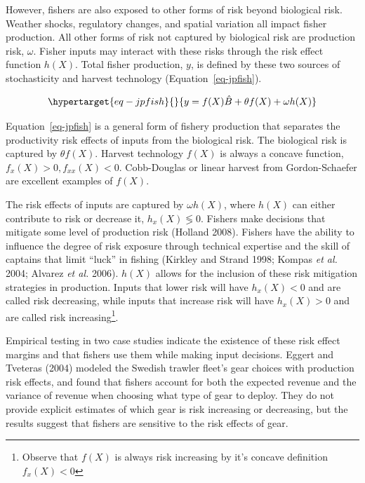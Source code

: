 \documentclass[
  letterpaper,
  DIV=11,
  numbers=noendperiod]{scrartcl}
\theoremstyle{plain}
\theoremstyle{plain}
\theoremstyle{remark}
\begin{document}
However, fishers are also exposed to other forms of risk beyond
biological risk. Weather shocks, regulatory changes, and spatial
variation all impact fisher production. All other forms of risk not
captured by biological risk are production risk, \(\omega\). Fisher
inputs may interact with these risks through the risk effect function
\(h(X)\). Total fisher production, \(y\), is defined by these two
sources of stochasticity and harvest technology
(Equation~\ref{eq-jpfish}).

\begin{equation}\protect\hypertarget{eq-jpfish}{}{
y=f(X)\hat{B}+\theta f(X)+\omega h(X)
}\label{eq-jpfish}\end{equation}

Equation~\ref{eq-jpfish} is a general form of fishery production that
separates the productivity risk effects of inputs from the biological
risk. The biological risk is captured by \(\theta f(X)\). Harvest
technology \(f(X)\) is always a concave function,
\(f_x(X)>0,f_{xx}(X)<0\). Cobb-Douglas or linear harvest from
Gordon-Schaefer are excellent examples of \(f(X)\).

The risk effects of inputs are captured by \(\omega h(X)\), where
\(h(X)\) can either contribute to risk or decrease it,
\(h_x(X)\lessgtr0\). Fishers make decisions that mitigate some level of
production risk (Holland 2008). Fishers have the ability to influence
the degree of risk exposure through technical expertise and the skill of
captains that limit ``luck'' in fishing (Kirkley and Strand 1998; Kompas
\emph{et al.} 2004; Alvarez \emph{et al.} 2006). \(h(X)\) allows for the
inclusion of these risk mitigation strategies in production. Inputs that
lower risk will have \(h_x(X)<0\) and are called risk decreasing, while
inputs that increase risk will have \(h_x(X)>0\) and are called risk
increasing\footnote{Observe that \(f(X)\) is always risk increasing by
  it's concave definition \(f_x(X)<0\)}.

Empirical testing in two case studies indicate the existence of these
risk effect margins and that fishers use them while making input
decisions. Eggert and Tveteras (2004) modeled the Swedish trawler
fleet's gear choices with production risk effects, and found that
fishers account for both the expected revenue and the variance of
revenue when choosing what type of gear to deploy. They do not provide
explicit estimates of which gear is risk increasing or decreasing, but
the results suggest that fishers are sensitive to the risk effects of
gear.
\end{document}
